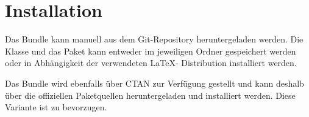 \documentclass[babel=ngerman,highlight=false]{skdoc}
\let\oldblindtext\blindtext
\renewcommand{\blindtext}{{\color{gray}\oldblindtext}}
\begin{document}
            
    \section{Installation}
        Das Bundle kann manuell aus dem Git-Repository heruntergeladen werden. Die Klasse und das Paket kann entweder im jeweiligen Ordner gespeichert werden oder in Abhängigkeit der verwendeten \LaTeX - Distribution installiert werden.
        
        Das Bundle wird ebenfalls über CTAN zur Verfügung gestellt und kann deshalb über die offiziellen Paketquellen heruntergeladen und installiert werden. Diese Variante ist zu bevorzugen.


    \PrintChanges
    \PrintIndex
\end{document}
